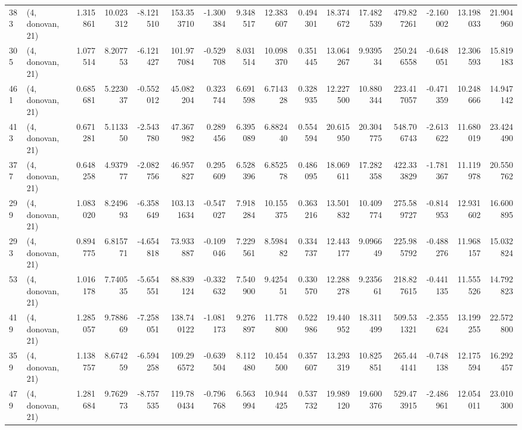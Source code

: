 \begin{tabular}{llrrrrrrrrrrrrrr}
383 &  (4, donovan, 21) &   1.315861 &  10.023312 &  -8.121510 &   153.353710 &  -1.300384 &   9.348517 &  12.383607 &  0.494301 &  18.374672 &  17.482539 &   479.827261 & -2.160002 &  13.198033 &  21.904960 \\
305 &  (4, donovan, 21) &   1.077514 &   8.207753 &  -6.121427 &   101.977084 &  -0.529708 &   8.031514 &  10.098370 &  0.351445 &  13.064267 &   9.939534 &   250.246558 & -0.648051 &  12.306593 &  15.819183 \\
461 &  (4, donovan, 21) &   0.685681 &   5.223037 &  -0.552012 &    45.082204 &   0.323744 &   6.691598 &   6.714328 &  0.328935 &  12.227500 &  10.880344 &   223.417057 & -0.471359 &  10.248666 &  14.947142 \\
413 &  (4, donovan, 21) &   0.671281 &   5.113350 &  -2.543780 &    47.367982 &   0.289456 &   6.395089 &   6.882440 &  0.554594 &  20.615950 &  20.304775 &   548.706743 & -2.613622 &  11.680019 &  23.424490 \\
377 &  (4, donovan, 21) &   0.648258 &   4.937977 &  -2.082756 &    46.957827 &   0.295609 &   6.528396 &   6.852578 &  0.486095 &  18.069611 &  17.282358 &   422.333829 & -1.781367 &  11.119978 &  20.550762 \\
299 &  (4, donovan, 21) &   1.083020 &   8.249693 &  -6.358649 &   103.131634 &  -0.547027 &   7.918284 &  10.155375 &  0.363216 &  13.501832 &  10.409774 &   275.589727 & -0.814953 &  12.931602 &  16.600895 \\
293 &  (4, donovan, 21) &   0.894775 &   6.815771 &  -4.654818 &    73.933887 &  -0.109046 &   7.229561 &   8.598482 &  0.334737 &  12.443177 &   9.096649 &   225.985792 & -0.488276 &  11.968157 &  15.032824 \\
53  &  (4, donovan, 21) &   1.016178 &   7.740535 &  -5.654551 &    88.839124 &  -0.332632 &   7.540900 &   9.425451 &  0.330570 &  12.288278 &   9.235661 &   218.827615 & -0.441135 &  11.555526 &  14.792823 \\
419 &  (4, donovan, 21) &   1.285057 &   9.788669 &  -7.258051 &   138.740122 &  -1.081173 &   9.276897 &  11.778800 &  0.522986 &  19.440952 &  18.311499 &   509.531321 & -2.355624 &  13.199255 &  22.572800 \\
359 &  (4, donovan, 21) &   1.138757 &   8.674259 &  -6.594258 &   109.296572 &  -0.639504 &   8.112480 &  10.454500 &  0.357607 &  13.293319 &  10.825851 &   265.444141 & -0.748138 &  12.175594 &  16.292457 \\
479 &  (4, donovan, 21) &   1.281684 &   9.762973 &  -8.757535 &   119.780434 &  -0.796768 &   6.563994 &  10.944425 &  0.537732 &  19.989120 &  19.600376 &   529.473915 & -2.486961 &  12.054011 &  23.010300 \\

\end{tabular}
